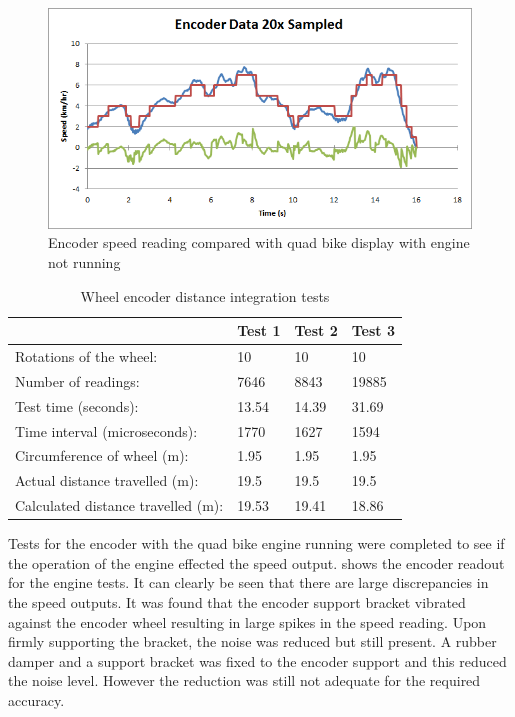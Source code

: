 \documentclass[main.tex]{subfiles}
\begin{document}
\begin{figure}[ht]
\includegraphics[width=1\textwidth]{5-Testing/encoder_data_20x_sampled.png}
\centering
\caption[Encoder speed reading compared with quad bike display]{Encoder speed reading compared with quad bike display with engine not running}
\end{figure}

\begin{table}[ht]
\centering
\caption{Wheel encoder distance integration tests}
\begin{tabular}{llll}
\toprule
                                   & Test 1 & Test 2 & Test 3 \\ \midrule
Rotations of the wheel:            & 10     & 10     & 10     \\
Number of readings:                & 7646   & 8843   & 19885  \\
Test time (seconds):               & 13.54  & 14.39  & 31.69  \\
Time interval (microseconds):      & 1770   & 1627   & 1594   \\
Circumference of wheel (m):        & 1.95   & 1.95   & 1.95   \\
Actual distance travelled (m):     & 19.5   & 19.5   & 19.5   \\
Calculated distance travelled (m): & 19.53  & 19.41  & 18.86  \\ \bottomrule
\end{tabular}
\end{table}

Tests for the encoder with the quad bike engine running were completed to see if the operation of the engine effected the speed output.  shows the encoder readout for the engine tests. It can clearly be seen that there are large discrepancies in the speed outputs. It was found that the encoder support bracket vibrated against the encoder wheel resulting in large spikes in the speed reading. Upon firmly supporting the bracket, the noise was reduced but still present. A rubber damper and a support bracket was fixed to the encoder support and this reduced the noise level. However the reduction was still not adequate for the required accuracy. 
\end{document}

